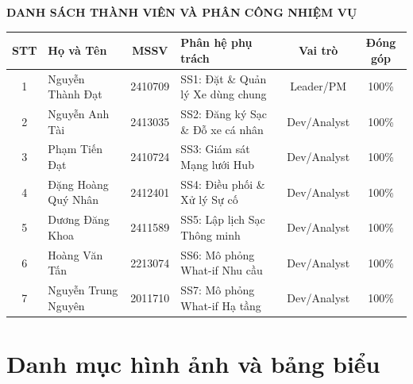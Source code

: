 \documentclass[12pt,a4paper]{article}
\begin{document}
\setcounter{page}{1}
\newpage

\vspace*{\fill}
\begin{center}
    {\large\textbf{DANH SÁCH THÀNH VIÊN VÀ PHÂN CÔNG NHIỆM VỤ}}\\[0.4cm]
    \renewcommand{\arraystretch}{1.45}
    \begin{tabularx}{\textwidth}{|c|X|c|X|c|c|}
        \hline
        \textbf{STT} & \textbf{Họ và Tên} & \textbf{MSSV} & \textbf{Phân hệ phụ trách} & \textbf{Vai trò} & \textbf{Đóng góp} \\
        \hline
        1 & Nguyễn Thành Đạt & 2410709 & SS1: Đặt \& Quản lý Xe dùng chung & Leader/PM & 100\% \\
        \hline
        2 & Nguyễn Anh Tài & 2413035 & SS2: Đăng ký Sạc \& Đỗ xe cá nhân & Dev/Analyst & 100\% \\
        \hline
        3 & Phạm Tiến Đạt & 2410724 & SS3: Giám sát Mạng lưới Hub & Dev/Analyst & 100\% \\
        \hline
        4 & Đặng Hoàng Quý Nhân & 2412401 & SS4: Điều phối \& Xử lý Sự cố & Dev/Analyst & 100\% \\
        \hline
        5 & Dương Đăng Khoa & 2411589 & SS5: Lập lịch Sạc Thông minh & Dev/Analyst & 100\% \\
        \hline
        6 & Hoàng Văn Tấn & 2213074 & SS6: Mô phỏng What-if Nhu cầu & Dev/Analyst & 100\% \\
        \hline
        7 & Nguyễn Trung Nguyên & 2011710 & SS7: Mô phỏng What-if Hạ tầng & Dev/Analyst & 100\% \\
        \hline
    \end{tabularx}
\end{center}
\vspace*{\fill}
\newpage

\tableofcontents
\newpage

\section*{Danh mục hình ảnh và bảng biểu}
\end{document}
